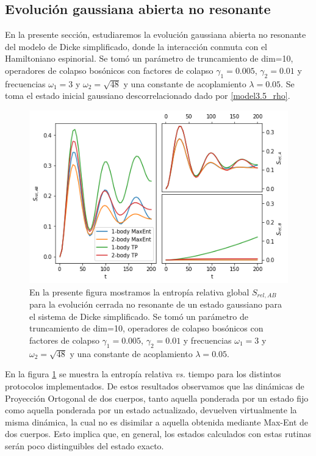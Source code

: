 \documentclass{report} %
\numberwithin{equation}{section}
\begin{document}
\subsection{Evolución gaussiana abierta no resonante}
\label{dicke_gaussian}

En la presente sección, estudiaremos la evolución gaussiana abierta no resonante del modelo de Dicke simplificado, donde la interacción conmuta con el Hamiltoniano espinorial. Se tomó un parámetro de truncamiento de dim=10, operadores de colapso bosónicos con factores de colapso $\gamma_1 = 0.005$, $\gamma_2 = 0.01$ y frecuencias $\omega_1 = 3$ y $\omega_2 = \sqrt{48}$ y una constante de acoplamiento $\lambda = 0.05$. Se toma el estado inicial gaussiano descorrelacionado dado por \eqref{model3.5_rho}.

\begin{figure}
    \centering
    \includegraphics[scale=0.7]{figs/section3_4/section5_bxs-open-nonres/rel_entropy_bxs_nonres.png}
    \caption{En la presente figura mostramos la entropía relativa global $S_{rel,AB}$ para la evolución cerrada no resonante de un estado gaussiano para el sistema de Dicke simplificado. Se tomó un parámetro de truncamiento de dim=10, operadores de colapso bosónicos con factores de colapso $\gamma_1 = 0.005$, $\gamma_2 = 0.01$ y frecuencias $\omega_1 = 3$ y $\omega_2 = \sqrt{48}$ y una constante de acoplamiento $\lambda = 0.05$.}
    \label{rel_entropy_open_nonres.png}
\end{figure}

En la figura \ref{rel_entropy_open_nonres.png} se muestra la entropía relativa \textit{vs.} tiempo para los distintos protocolos implementados. De estos resultados observamos que las dinámicas de Proyección Ortogonal de dos cuerpos, tanto aquella ponderada por un estado fijo como aquella ponderada por un estado actualizado, devuelven virtualmente la misma dinámica, la cual no es disimilar a aquella obtenida mediante Max-Ent de dos cuerpos. Esto implica que, en general, los estados calculados con estas rutinas serán poco distinguibles del estado exacto.  
\end{document}
